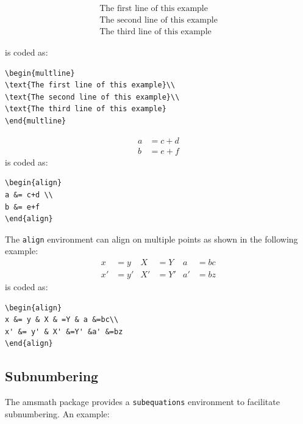 \documentclass[lettersize,journal]{IEEEtran}
\begin{document}
\begin{multline}
  \text{The first line of this example}\\
  \text{The second line of this example}\\
  \text{The third line of this example}
\end{multline}

\noindent is coded as:
\begin{verbatim}
\begin{multline}
\text{The first line of this example}\\
\text{The second line of this example}\\
\text{The third line of this example}
\end{multline}
\end{verbatim}

\begin{align}
  a & = c+d \\
  b & = e+f
\end{align}
\noindent is coded as:
\begin{verbatim}
\begin{align}
a &= c+d \\
b &= e+f
\end{align}
\end{verbatim}

The {\tt{align}} environment can align on multiple  points as shown in the following example:
\begin{align}
  x  & = y  & X  & =Y  & a  & =bc \\
  x' & = y' & X' & =Y' & a' & =bz
\end{align}
\noindent is coded as:
\begin{verbatim}
\begin{align}
x &= y & X & =Y & a &=bc\\
x' &= y' & X' &=Y' &a' &=bz
\end{align}
\end{verbatim}





\subsection{Subnumbering}
\noindent The amsmath package provides a {\tt{subequations}} environment to facilitate subnumbering. An example:
\end{document}

